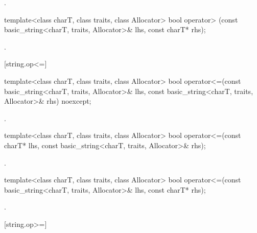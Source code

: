 \begin{itemdescr}
\pnum
\returns
{}.
\end{itemdescr}

%
\begin{itemdecl}
template<class charT, class traits, class Allocator>
  bool operator> (const basic_string<charT, traits, Allocator>& lhs,
                  const charT* rhs);
\end{itemdecl}

\begin{itemdescr}
\pnum
\returns
{}.
\end{itemdescr}

[string.op<=]{}

%
\begin{itemdecl}
template<class charT, class traits, class Allocator>
  bool operator<=(const basic_string<charT, traits, Allocator>& lhs,
                  const basic_string<charT, traits, Allocator>& rhs) noexcept;
\end{itemdecl}

\begin{itemdescr}
\pnum
\returns
{}.
\end{itemdescr}

%
\begin{itemdecl}
template<class charT, class traits, class Allocator>
  bool operator<=(const charT* lhs,
                  const basic_string<charT, traits, Allocator>& rhs);
\end{itemdecl}

\begin{itemdescr}
\pnum
\returns
{}.
\end{itemdescr}

%
\begin{itemdecl}
template<class charT, class traits, class Allocator>
  bool operator<=(const basic_string<charT, traits, Allocator>& lhs,
                  const charT* rhs);
\end{itemdecl}

\begin{itemdescr}
\pnum
\returns
{}.
\end{itemdescr}

[string.op>=]{}


